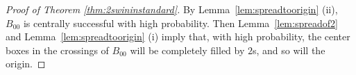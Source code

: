 \documentclass{article}
\numberwithin{equation}{section}
\begin{document}
 

\begin{proof}[Proof of Theorem \ref{thm:2swininstandard}]
By Lemma~\ref{lem:spreadtoorigin} (ii),
$B_{00}$ is centrally successful with high probability. Then 
Lemma~\ref{lem:spreadof2} and Lemma~\ref{lem:spreadtoorigin} (i) imply that, 
with high probability, the center boxes in the crossings of $B_{00}$ will be completely filled by $2$s, and so will the origin.
\end{proof}



\end{document}
